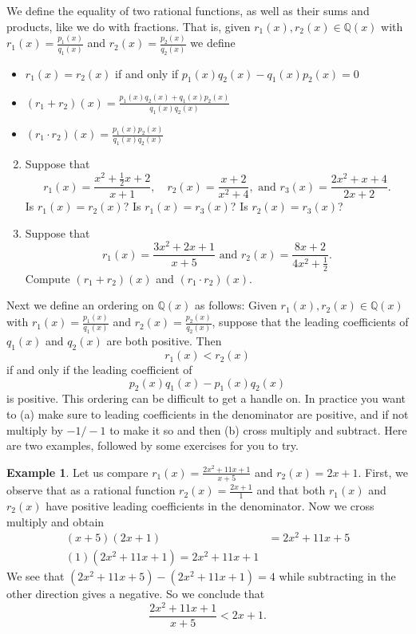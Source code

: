 \documentclass[11pt]{article}
\newenvironment{task}
	{\begin{mdframed}[linecolor=lightgray, linewidth=3pt]\raggedright}
	{\end{mdframed}}
\theoremstyle{definition}
\newtheorem{example}[theorem]{Example}
\begin{document}
\begin{task}
We define the equality of two rational functions, as well as their sums and products, like we do with fractions. That is, given $r_1(x),r_2(x)\in\mathbb{Q}(x)$ with
$r_1(x) = \frac{p_1(x)}{q_1(x)}$ and $r_2(x) = \frac{p_2(x)}{q_2(x)}$ we define
\begin{itemize}
  \item $r_1(x)=r_2(x)$ if and only if $p_1(x)q_2(x) - q_1(x)p_2(x) = 0$
  \item $(r_1 + r_2)(x) = \frac{p_1(x)q_2(x) + q_1(x)p_2(x)}{q_1(x)q_2(x)}$
  \item $(r_1\cdot r_2)(x) = \frac{p_1(x)p_2(x)}{q_1(x)q_2(x)}$
\end{itemize}

\begin{enumerate}
    \setcounter{enumi}{1}
  \item Suppose that
    \[ r_1(x) = \frac{x^2 + \frac{1}{2}x + 2}{x+1},\quad  r_2(x) = \frac{x + 2}{x^2 +4}, \text{ and } r_3(x)=\frac{2x^2 + x + 4}{2x+2}.\]
    Is $r_1(x) = r_2(x)$? Is $r_1(x) = r_3(x)$? Is $r_2(x) = r_3(x)$?
  \item Suppose that 
    \[ r_1(x) = \frac{3x^2 + 2x + 1}{x+5} \text{ and } r_2(x) = \frac{8x + 2}{4x^2 +\frac{1}{2}}.\]
    Compute $(r_1+r_2)(x)$ and $(r_1\cdot r_2)(x)$.
\end{enumerate}

Next we define an ordering on $\mathbb{Q}(x)$ as follows: Given $r_1(x),r_2(x)\in\mathbb{Q}(x)$ with
$r_1(x) = \frac{p_1(x)}{q_1(x)}$ and $r_2(x) = \frac{p_2(x)}{q_2(x)}$, suppose that the leading coefficients of $q_1(x)$ and $q_2(x)$ are both positive. Then
\[ r_1(x) < r_2(x) \] 
if and only if the leading coefficient of 
\[ p_2(x)q_1(x) - p_1(x)q_2(x) \]
is positive. This ordering can be difficult to get a handle on. In practice you want to (a) make sure to leading coefficients in the denominator are positive, and
if not multiply by $-1/-1$ to make it so and then (b) cross multiply and subtract. Here are two examples, followed by some exercises for you to try.

\begin{example}
  Let us compare $r_1(x) = \frac{2x^2 + 11x + 1}{x+5}$ and $r_2(x) = 2x +1$. First, we observe that as a rational function $r_2(x) = \frac{2x+1}{1}$ and 
  that both $r_1(x)$ and $r_2(x)$ have positive leading coefficients in the denominator. Now we cross multiply and obtain
  \begin{align*}
    (x+5)(2x+1) &= 2x^2 + 11x + 5\\
    (1)(2x^2 + 11x + 1) = 2x^2 + 11x + 1
  \end{align*}
  We see that $(2x^2+11x + 5)-(2x^2+11x+1) = 4$ while subtracting in the other direction gives a negative. So we conclude that
  \[ \frac{2x^2+11x+1}{x+5} < 2x + 1.\]
\end{example}


\end{task}
\end{document}
